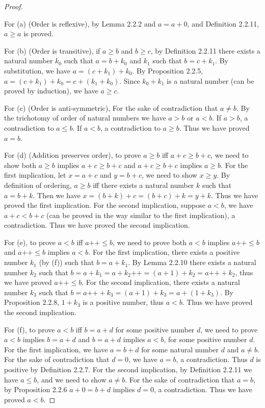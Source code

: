 \documentclass[a4paper]{article}
\begin{document}
\begin{proof}

$ $\newline

For (a) (Order is reflexive), by Lemma 2.2.2 and $a = a + 0$, and Definition 2.2.11, $a \ge a$ is proved.

For (b) (Order is transitive), if $a \ge b$ and $b \ge c$, by Definition 2.2.11 there exists a natural number $k_0$ such that $a = b + k_0$ and $k_1$ such that $b = c + k_1$. By substitution, we have $a = \left( c + k_1 \right) + k_0$. By Proposition 2.2.5, $a = \left( c + k_1 \right) + k_0 = c + \left( k_1 + k_0 \right) $. Since $k_0 + k_1$ is a natural number (can be proved by induction), we have $a \ge c$.

For (c) (Order is anti-symmetric), For the sake of contradiction that $a \neq b$. By the trichotomy of order of natural numbers we have $a > b$ or $a < b$. If $a > b$, a contradiction to $a \le b$. If $a < b$, a contradiction to  $a \ge b$. Thus we have proved $a = b$.

For (d) (Addition preserves order), to prove $a \ge b$ iff $a + c \ge b + c$, we need to show both $a \ge b$ implies $a + c \ge b + c$ and $a + c \ge b + c$ implies $a \ge b$. For the first implication, let $x = a + c$ and $y = b + c$, we need to show $x \ge y$. By definition of ordering, $a \ge b$ iff there exists a natural number $k$ such that $a = b + k$. Then we have $x = \left( b + k \right) + c = \left( b + c \right) + k = y + k$. Thus we have proved the first implication. For the second implication, suppose $a < b$, we have $a + c < b + c$ (can be proved in the way similar to the first implication), a contradiction. Thus we have proved the second implication.

For (e), to prove $a < b$ iff $a\text{++} \le b$, we need to prove both $a < b$ implies $a\text{++} \le b$ and $a\text{++} \le b$ implies $a < b$. For the first implication, there exists a positive number $k_1$ (by (f)) such that $b = a + k_1$. By Lemma 2.2.10 there exists a natural number $k_2$ such that $b = a + k_1 = a + k_2\text{++} = \left( a + 1 \right) + k_2 = a\text{++} + k_2$, thus we have proved $a\text{++} \le b$. For the second implication, there exists a natural number $k_3$ such that $b = a\text{++} + k_3 = (a + 1) + k_3 = a + (1 + k_3)$. By Proposition 2.2.8, $1 + k_3$ is a positive number, thus $a < b$. Thus we have proved the second implication.

For (f), to prove $a < b$ iff $b = a + d$ for some positive number $d$, we need to prove $a < b$ implies $b = a + d$ and $b = a + d$ implies $a < b$, for some positive number $d$. For the first implication, we have $a = b + d$ for some natural number $d$ and $a \neq b$. For the sake of contradiction that $d = 0$, we have $a = b$, a contradiction. Thus $d$ is positive by Definition 2.2.7. For the second implication, by Definition 2.2.11 we have $a \le b$, and we need to show $a \neq b$. For the sake of contradiction that $a = b$, by Proposition 2.2.6 $a + 0 = b + d$ implies $d = 0$, a contradiction. Thus we have proved $a < b$.

\end{proof} 
\end{document}
